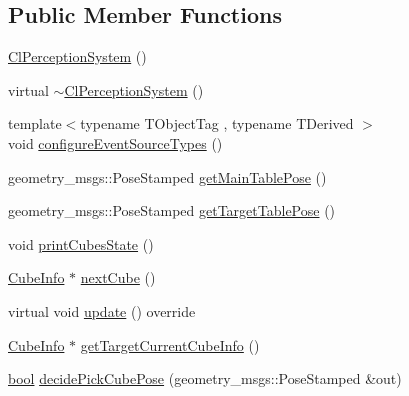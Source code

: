 \subsection*{Public Member Functions}
\begin{DoxyCompactItemize}
\item 
\hyperlink{classsm__moveit__4_1_1cl__perception__system_1_1ClPerceptionSystem_aeb969985d995c4ba91f1f2f693fe2c3a}{Cl\+Perception\+System} ()
\item 
virtual \hyperlink{classsm__moveit__4_1_1cl__perception__system_1_1ClPerceptionSystem_aa914df8a54f247c92cb0e7c3568b9e44}{$\sim$\+Cl\+Perception\+System} ()
\item 
{\footnotesize template$<$typename T\+Object\+Tag , typename T\+Derived $>$ }\\void \hyperlink{classsm__moveit__4_1_1cl__perception__system_1_1ClPerceptionSystem_a693927b659a3f739f2bc2ac403df0f1a}{configure\+Event\+Source\+Types} ()
\item 
geometry\+\_\+msgs\+::\+Pose\+Stamped \hyperlink{classsm__moveit__4_1_1cl__perception__system_1_1ClPerceptionSystem_a234d70a76bb5bf73f23d420c2b541632}{get\+Main\+Table\+Pose} ()
\item 
geometry\+\_\+msgs\+::\+Pose\+Stamped \hyperlink{classsm__moveit__4_1_1cl__perception__system_1_1ClPerceptionSystem_a84da4b68fddd1b2c81d69d5f7aafeb94}{get\+Target\+Table\+Pose} ()
\item 
void \hyperlink{classsm__moveit__4_1_1cl__perception__system_1_1ClPerceptionSystem_a70ec0058531af470ab52268bd6540ddd}{print\+Cubes\+State} ()
\item 
\hyperlink{structsm__moveit__4_1_1cl__perception__system_1_1CubeInfo}{Cube\+Info} $\ast$ \hyperlink{classsm__moveit__4_1_1cl__perception__system_1_1ClPerceptionSystem_ab9ee8563cf55a88b34e81a2281da996f}{next\+Cube} ()
\item 
virtual void \hyperlink{classsm__moveit__4_1_1cl__perception__system_1_1ClPerceptionSystem_a91de8cf71c93738f8bcbea388c84a5dd}{update} () override
\item 
\hyperlink{structsm__moveit__4_1_1cl__perception__system_1_1CubeInfo}{Cube\+Info} $\ast$ \hyperlink{classsm__moveit__4_1_1cl__perception__system_1_1ClPerceptionSystem_ac4b944cebb2055a85a33129665df5dcf}{get\+Target\+Current\+Cube\+Info} ()
\item 
\hyperlink{classbool}{bool} \hyperlink{classsm__moveit__4_1_1cl__perception__system_1_1ClPerceptionSystem_af1143d68db667021480383673244bb04}{decide\+Pick\+Cube\+Pose} (geometry\+\_\+msgs\+::\+Pose\+Stamped \&out)

\end{DoxyCompactItemize}
